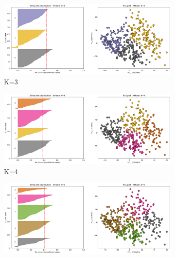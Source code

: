 \begin{figure}[H]
    \captionsetup[subfigure]{justification=Centering}
    \centering
    \begin{subfigure}[!t]{0.49\textwidth}
        \includegraphics[width=\textwidth]{Sections/ClusteringAnalysis/Resources/cs_top3/sill_distrib/KMeans_3_sill_distrib.png}
        \caption{K=3}
    \end{subfigure}
    \centering
    \begin{subfigure}[!t]{0.49\textwidth}
        \includegraphics[width=\textwidth]{Sections/ClusteringAnalysis/Resources/cs_top3/sill_distrib/KMeans_4_sill_distrib.png}
        \caption{K=4}
    \end{subfigure}
    \centering
    \begin{subfigure}[!t]{0.49\textwidth}
        \includegraphics[width=\textwidth]{Sections/ClusteringAnalysis/Resources/cs_top3/sill_distrib/KMeans_5_sill_distrib.png}

\end{subfigure}
\end{figure}
